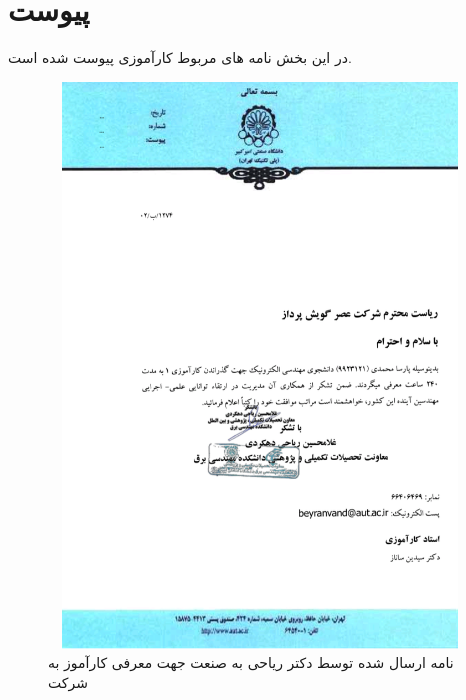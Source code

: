 \chapter*{‌پیوست}
در این بخش نامه های مربوط کارآموزی پیوست شده است.

\begin{figure}[H]
  \centering
  \includegraphics[width=1\textwidth,height=15cm]{letters/riahi_letter.png}
  \caption{
   نامه ارسال شده توسط دکتر ریاحی به صنعت جهت معرفی کارآموز به شرکت
  }
  \label{img:riahi_letter}
\end{figure}

